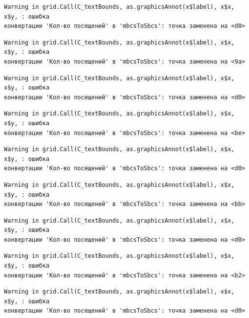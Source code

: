 \documentclass[
  letterpaper,
  DIV=11,
  numbers=noendperiod]{scrreprt}
\begin{document}
\begin{verbatim}
Warning in grid.Call(C_textBounds, as.graphicsAnnot(x$label), x$x, x$y, : ошибка
конвертации 'Кол-во посещений' в 'mbcsToSbcs': точка заменена на <d0>
\end{verbatim}

\begin{verbatim}
Warning in grid.Call(C_textBounds, as.graphicsAnnot(x$label), x$x, x$y, : ошибка
конвертации 'Кол-во посещений' в 'mbcsToSbcs': точка заменена на <9a>
\end{verbatim}

\begin{verbatim}
Warning in grid.Call(C_textBounds, as.graphicsAnnot(x$label), x$x, x$y, : ошибка
конвертации 'Кол-во посещений' в 'mbcsToSbcs': точка заменена на <d0>
\end{verbatim}

\begin{verbatim}
Warning in grid.Call(C_textBounds, as.graphicsAnnot(x$label), x$x, x$y, : ошибка
конвертации 'Кол-во посещений' в 'mbcsToSbcs': точка заменена на <be>
\end{verbatim}

\begin{verbatim}
Warning in grid.Call(C_textBounds, as.graphicsAnnot(x$label), x$x, x$y, : ошибка
конвертации 'Кол-во посещений' в 'mbcsToSbcs': точка заменена на <d0>
\end{verbatim}

\begin{verbatim}
Warning in grid.Call(C_textBounds, as.graphicsAnnot(x$label), x$x, x$y, : ошибка
конвертации 'Кол-во посещений' в 'mbcsToSbcs': точка заменена на <bb>
\end{verbatim}

\begin{verbatim}
Warning in grid.Call(C_textBounds, as.graphicsAnnot(x$label), x$x, x$y, : ошибка
конвертации 'Кол-во посещений' в 'mbcsToSbcs': точка заменена на <d0>
\end{verbatim}

\begin{verbatim}
Warning in grid.Call(C_textBounds, as.graphicsAnnot(x$label), x$x, x$y, : ошибка
конвертации 'Кол-во посещений' в 'mbcsToSbcs': точка заменена на <b2>
\end{verbatim}

\begin{verbatim}
Warning in grid.Call(C_textBounds, as.graphicsAnnot(x$label), x$x, x$y, : ошибка
конвертации 'Кол-во посещений' в 'mbcsToSbcs': точка заменена на <d0>
\end{verbatim}
\end{document}
